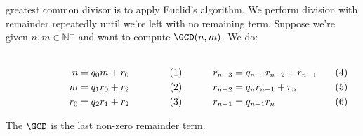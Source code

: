 \documentclass{article}                                                        %
\begin{document}
            greatest common divisor is to apply Euclid's algorithm. We perform
            division with remainder repeatedly until we're left with no
            remaining term. Suppose we're given $n,m\in\mathbb{N}^{+}$ and want
            to compute $\GCD(n,m)$. We do:
            \par
            \begin{subequations}
                \begin{minipage}[b]{0.49\textwidth}
                    \centering
                    \begin{align}
                        n&=q_{0}m+r_{0}\\
                        m&=q_{1}r_{0}+r_{2}\\
                        r_{0}&=q_{2}r_{1}+r_{2}
                    \end{align}
                \end{minipage}
                \hfill
                \begin{minipage}[b]{0.49\textwidth}
                    \centering
                    \begin{align}
                        r_{n-3}&=q_{n-1}r_{n-2}+r_{n-1}\\
                        r_{n-2}&=q_{n}r_{n-1}+r_{n}\\
                        r_{n-1}&=q_{n+1}r_{n}
                    \end{align}
                \end{minipage}
            \end{subequations}
            \par\vspace{2.5ex}
            The $\GCD$ is the last non-zero remainder term.
\end{document}
